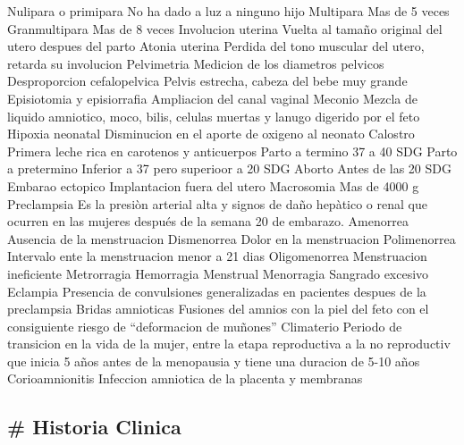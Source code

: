 \documentclass[
]{article}
\begin{document}
\textbar{} Nulipara o primipara \textbar{} No ha dado a luz a ninguno
hijo \textbar{} \textbar{} Multipara \textbar{} Mas de 5 veces
\textbar{} \textbar{} Granmultipara \textbar{} Mas de 8 veces \textbar{}
\textbar{} Involucion uterina \textbar{} Vuelta al tamaño original del
utero despues del parto \textbar{} \textbar{} Atonia uterina \textbar{}
Perdida del tono muscular del utero, retarda su involucion \textbar{}
\textbar{} Pelvimetria \textbar{} Medicion de los diametros pelvicos
\textbar{} \textbar{} Desproporcion cefalopelvica \textbar{} Pelvis
estrecha, cabeza del bebe muy grande \textbar{} \textbar{} Episiotomia y
episiorrafia \textbar{} Ampliacion del canal vaginal \textbar{}
\textbar{} Meconio \textbar{} Mezcla de liquido amniotico, moco, bilis,
celulas muertas y lanugo digerido por el feto \textbar{} \textbar{}
Hipoxia neonatal \textbar{} Disminucion en el aporte de oxigeno al
neonato \textbar{} \textbar{} Calostro \textbar{} Primera leche rica en
carotenos y anticuerpos \textbar{} \textbar{} Parto a termino \textbar{}
37 a 40 SDG \textbar{} \textbar{} Parto a pretermino \textbar{} Inferior
a 37 pero superioor a 20 SDG \textbar{} \textbar{} Aborto \textbar{}
Antes de las 20 SDG \textbar{} \textbar{} Embarao ectopico \textbar{}
Implantacion fuera del utero \textbar{} \textbar{} Macrosomia \textbar{}
Mas de 4000 g \textbar{} \textbar{} Preclampsia \textbar{} Es la presiòn
arterial alta y signos de daño hepàtico o renal que ocurren en las
mujeres después de la semana 20 de embarazo. \textbar{} \textbar{}
Amenorrea \textbar{} Ausencia de la menstruacion \textbar{} \textbar{}
Dismenorrea \textbar{} Dolor en la menstruacion \textbar{} \textbar{}
Polimenorrea \textbar{} Intervalo ente la menstruacion menor a 21 dias
\textbar{} \textbar{} Oligomenorrea \textbar{} Menstruacion ineficiente
\textbar{} \textbar{} Metrorragia \textbar{} Hemorragia Menstrual
\textbar{} \textbar{} Menorragia \textbar{} Sangrado excesivo \textbar{}
\textbar{} Eclampia \textbar{} Presencia de convulsiones generalizadas
en pacientes despues de la preclampsia \textbar{} \textbar{} Bridas
amnioticas \textbar{} Fusiones del amnios con la piel del feto con el
consiguiente riesgo de ``deformacion de muñones'' \textbar{} \textbar{}
Climaterio \textbar{} Periodo de transicion en la vida de la mujer,
entre la etapa reproductiva a la no reproductiv que inicia 5 años antes
de la menopausia y tiene una duracion de 5-10 años \textbar{} \textbar{}
Corioamnionitis \textbar{} Infeccion amniotica de la placenta y
membranas \textbar{}

\hypertarget{historia-clinica}{%
\subsection{\# Historia Clinica}\label{historia-clinica}}
\end{document}
